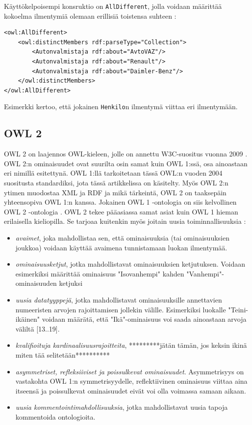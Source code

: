 \documentclass[finnish]{tktltiki2}
\theoremstyle{definition}
\theoremstyle{remark}
\begin{document}
Käyttökelpoisempi konsruktio on \texttt{AllDifferent}, jolla voidaan määrittää kokoelma ilmentymiä olemaan erillisiä toistensa suhteen \cite{SWM04}:
\begin{verbatim}
<owl:AllDifferent>
    <owl:distinctMembers rdf:parseType="Collection">
        <Autonvalmistaja rdf:about="AvtoVAZ"/>
        <Autonvalmistaja rdf:about="Renault"/>
        <Autonvalmistaja rdf:about="Daimler-Benz"/>
    </owl:distinctMembers>
</owl:AllDifferent>
\end{verbatim}
Esimerkki kertoo, että jokainen \texttt{Henkilo}n ilmentymä viittaa eri ilmentymään. 

\subsection{OWL 2}
OWL 2 on laajennos OWL-kieleen, jolle on annettu W3C-suositus vuonna 2009 \cite{OWL2}. OWL 2:n ominaisuudet ovat suurilta osin samat kuin OWL 1:ssä, osa ainoastaan eri nimillä esitettynä. OWL 1:llä tarkoitetaan tässä OWL:n vuoden 2004 suositusta standardiksi, jota tässä artikkelissa on käsitelty.  Myös OWL 2:n ytimen muodostaa XML ja RDF ja mikä tärkeintä, OWL 2 on taaksepäin yhteensopiva OWL 1:n kanssa. Jokainen OWL 1 -ontologia on siis kelvollinen OWL 2 -ontologia \cite{OWL2}. OWL 2 tekee pääasiassa samat asiat kuin OWL 1 hieman erilaisella kieliopilla. Se tarjoaa kuitenkin myös   joitain uusia toiminnallisuuksia \cite{OWL2}: 
\begin{itemize}
\item \textit{avaimet}, joka mahdollistaa sen, että ominaisuuksia (tai ominaisuuksien joukkoa) voidaan käyttää avaimena tunnistamaan luokan ilmentymää.
\item \textit{ominaisuusketjut}, jotka mahdollistavat ominaisuuksien ketjutuksen. Voidaan esimerkiksi määrittää ominaisuus "Isovanhempi" kahden "Vanhempi"-ominaisuuden ketjuksi
\item \textit{uusia datatyyppejä}, jotka mahdollistavat ominaisuuksille annettavien numeeristen arvojen rajoittamisen jollekin välille. Esimerkiksi luokalle "Teini-ikäinen" voidaan määrätä, että "Ikä"-ominaisuus voi saada ainoastaan arvoja väliltä [13..19].
\item \textit{kvalifioituja kardinaalisuusrajoitteita}, *********jätän tämän, jos keksin ikinä miten tää selitetään**********
\item \textit{asymmetriset, refleksiiviset ja poissulkevat ominaisuudet}. Asymmetrisyys on vastakohta OWL 1:n symmetrisyydelle, reflektiivinen ominaisuus viittaa aina itseensä ja poissulkevat ominaisuudet eivät voi olla voimassa samaan aikaan. 
\item \textit{uusia kommentointimahdollisuuksia}, jotka mahdollistavat uusia tapoja kommentoida ontologioita.   
\end{itemize}
\end{document}
